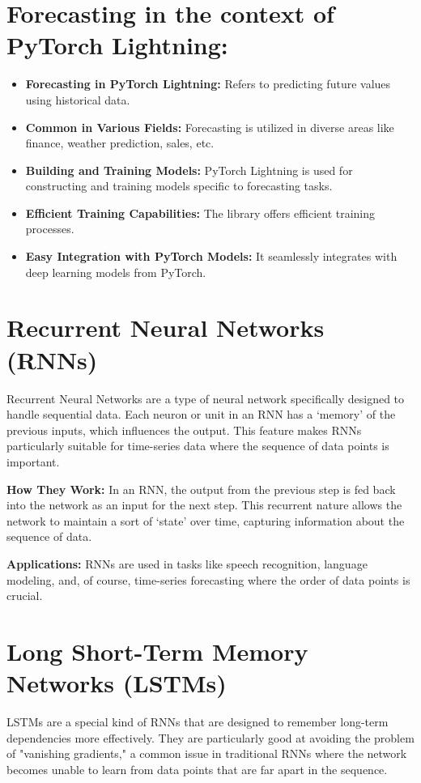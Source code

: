\documentclass{article}
\begin{document}
\section{Forecasting in the context of PyTorch Lightning:}
\begin{itemize}[label={--}]
    \item \textbf{Forecasting in PyTorch Lightning:} Refers to predicting future values using historical data.
    \item \textbf{Common in Various Fields:} Forecasting is utilized in diverse areas like finance, weather prediction, sales, etc.
    \item \textbf{Building and Training Models:} PyTorch Lightning is used for constructing and training models specific to forecasting tasks.
    \item \textbf{Efficient Training Capabilities:} The library offers efficient training processes.
    \item \textbf{Easy Integration with PyTorch Models:} It seamlessly integrates with deep learning models from PyTorch.

\end{itemize}

\section{Recurrent Neural Networks (RNNs)}
Recurrent Neural Networks are a type of neural network specifically designed to handle sequential data. Each neuron or unit in an RNN has a `memory' of the previous inputs, which influences the output. This feature makes RNNs particularly suitable for time-series data where the sequence of data points is important.

\textbf{How They Work:} In an RNN, the output from the previous step is fed back into the network as an input for the next step. This recurrent nature allows the network to maintain a sort of `state' over time, capturing information about the sequence of data.

\textbf{Applications:} RNNs are used in tasks like speech recognition, language modeling, and, of course, time-series forecasting where the order of data points is crucial.

\section{Long Short-Term Memory Networks (LSTMs)}
LSTMs are a special kind of RNNs that are designed to remember long-term dependencies more effectively. They are particularly good at avoiding the problem of "vanishing gradients," a common issue in traditional RNNs where the network becomes unable to learn from data points that are far apart in the sequence.
\end{document}
